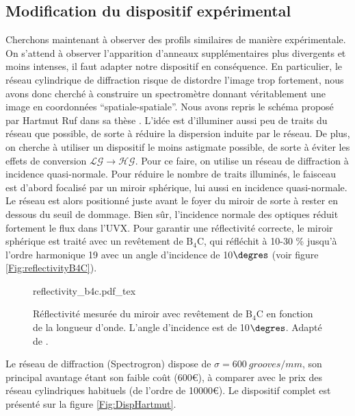 \subsection{Modification du dispositif expérimental}
Cherchons maintenant à observer des profils similaires de manière expérimentale. On s'attend à observer l'apparition d'anneaux supplémentaires plus divergents et moins intenses, il faut adapter notre dispositif en conséquence. En particulier, le réseau cylindrique de diffraction risque de distordre l'image trop fortement, nous avons donc cherché à construire un spectromètre donnant véritablement une image en coordonnées ``spatiale-spatiale''. 
Nous avons repris le schéma proposé par Hartmut Ruf dans sa thèse . L'idée est d'illuminer aussi peu de traits du réseau que possible, de sorte à réduire la dispersion induite par le réseau. De plus, on cherche à utiliser un dispositif le moins astigmate possible, de sorte à éviter les effets de conversion $\mathcal{LG}\rightarrow \mathcal{HG}$. Pour ce faire, on utilise un réseau de diffraction à incidence quasi-normale. Pour réduire le nombre de traits illuminés, le faisceau est d'abord focalisé par un miroir sphérique, lui aussi en incidence quasi-normale. Le réseau est alors positionné juste avant le foyer du miroir de sorte à rester en dessous du seuil de dommage. Bien sûr, l'incidence normale des optiques réduit fortement le flux dans l'UVX. Pour garantir une réflectivité correcte, le miroir sphérique est traité avec un revêtement de $\mathrm{B}_\mathrm{4}\mathrm{C}$, qui réfléchit à 10-30 \% jusqu'à l'ordre harmonique 19 avec un angle d'incidence de 10$\degres$ (voir figure \ref{Fig:reflectivityB4C}). 

\begin{figure}[!ht]
\centering
\def\svgwidth{.7\columnwidth}
{reflectivity_b4c.pdf_tex}
\caption{Réflectivité mesurée du miroir avec revêtement de $\mathrm{B}_\mathrm{4}\mathrm{C}$ en fonction de la longueur d'onde. L'angle d'incidence est de 10$\degres$. Adapté de .}
\label{Fig:reflectivity_B4C}
\end{figure}

Le réseau de diffraction (Spectrogron) dispose de $\sigma=\SI{600}{grooves/mm}$, son principal avantage étant son faible coût (600€), à comparer avec le prix des réseau cylindriques habituels (de l'ordre de 10000€). Le dispositif complet est présenté sur la figure \ref{Fig:DispHartmut}.


